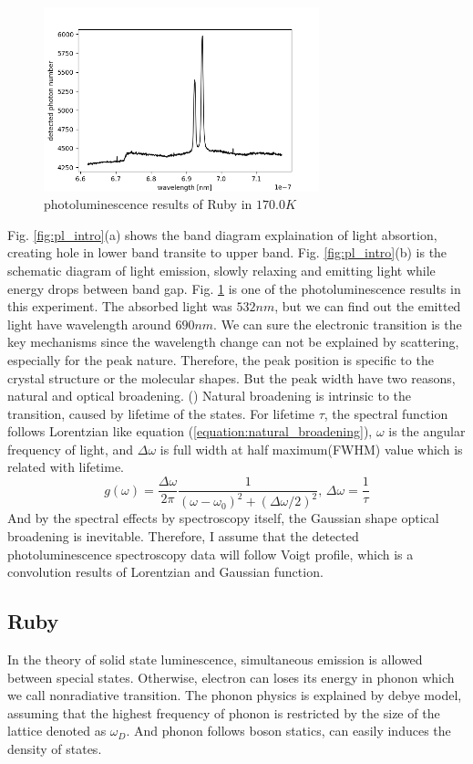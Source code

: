 \documentclass{article}
\begin{document}
 \begin{figure}[ht]
    \centering
    \includegraphics[width=8cm]{../results/Ruby(170.0)_raw_fig.png}
    \caption{photoluminescence results of Ruby in $170.0K$}
    \label{fig:pl_sample}
 \end{figure}
 Fig. \ref{fig:pl_intro}(a) shows the band diagram explaination of light absortion, creating hole in lower band transite to upper band.
 Fig. \ref{fig:pl_intro}(b) is the schematic diagram of light emission, slowly relaxing and emitting light while energy drops between band gap.
 Fig. \ref{fig:pl_sample} is one of the photoluminescence results in this experiment.
 The absorbed light was $532nm$, but we can find out the emitted light have wavelength around $690nm$.
 We can sure the electronic transition is the key mechanisms since the wavelength change can not be explained by scattering, especially for the peak nature.
 Therefore, the peak position is specific to the crystal structure or the molecular shapes.
 But the peak width have two reasons, natural and optical broadening. (\cite{quantum_optics})
 Natural broadening is intrinsic to the transition, caused by lifetime of the states.
 For lifetime $\tau$, the spectral function follows Lorentzian like equation (\ref{equation:natural_broadening}), $\omega$ is the angular frequency of light, and $\Delta \omega$ is full width at half maximum(FWHM) value which is related with lifetime.
 \begin{equation}
   g(\omega) = \frac{\Delta \omega}{2 \pi} \frac{1}{(\omega-\omega_0)^2 + (\Delta \omega/2)^2},\, \Delta \omega = \frac{1}{\tau}
   \label{equation:natural_broadening}
 \end{equation}
 And by the spectral effects by spectroscopy itself, the Gaussian shape optical broadening is inevitable.
 Therefore, I assume that the detected photoluminescence spectroscopy data will follow Voigt profile, which is a convolution results of Lorentzian and Gaussian function.

 \subsection{Ruby}
 \label{intro:ruby}
 In the theory of solid state luminescence, simultaneous emission is allowed between special states.
 Otherwise, electron can loses its energy in phonon which we call nonradiative transition.
 The phonon physics is explained by debye model, assuming that the highest frequency of phonon is restricted by the size of the lattice denoted as $\omega_D$.
 And phonon follows boson statics, can easily induces the density of states.
 
\end{document}
